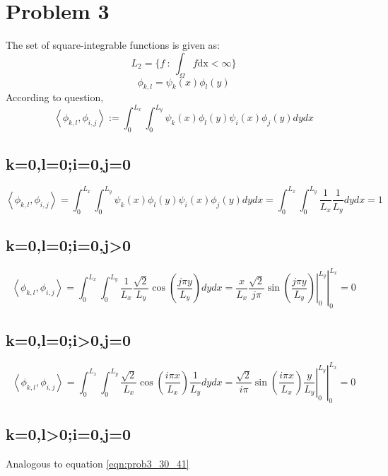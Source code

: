 \documentclass[12pt]{article}
\begin{document}
\section*{Problem 3}
The set of square-integrable functions is given as:
\begin{equation}
L_2 = \{f \ : \ \int_\Omega f \mathrm{dx} < \infty\}
\end{equation}
\begin{equation}
\phi_{k,l}=\psi_k(x)\phi_l(y)
\end{equation}
According to question,
\begin{equation}
\left<\phi_{k,l},\phi_{i,j}\right>:=\int_{0}^{L_x} \int_{0}^{L_y}\psi_k(x)\phi_l(y)\psi_i(x)\phi_j(y)dydx
\end{equation}

\subsection*{k=0,l=0;i=0,j=0}
\begin{equation}
\left<\phi_{k,l},\phi_{i,j}\right>=\int_{0}^{L_x} \int_{0}^{L_y}\psi_k(x)\phi_l(y)\psi_i(x)\phi_j(y)dydx=\int_{0}^{L_x} \int_{0}^{L_y} \frac{1}{L_x} \frac{1}{L_y}dydx=1
\end{equation}
\subsection*{k=0,l=0;i=0,j>0}
\begin{equation}
\left<\phi_{k,l},\phi_{i,j}\right>=\int_{0}^{L_x} \int_{0}^{L_y} \frac{1}{L_x}\frac{\sqrt{2}}{L_y}\cos(\frac{j \pi y}{L_y})dydx=\left.\left.\frac{x}{L_x}\frac{\sqrt{2}}{j \pi}\sin(\frac{j \pi y}{L_y})\right|_{0}^{L_y} \right|_{0}^{L_x}=0
\label{eqn:prob3_30_41}
\end{equation}

\subsection*{k=0,l=0;i>0,j=0}
\begin{equation}
\left<\phi_{k,l},\phi_{i,j}\right>=\int_{0}^{L_x} \int_{0}^{L_y} \frac{\sqrt{2}}{L_x}\cos(\frac{i \pi x}{L_x})\frac{1}{L_y}dydx=\left.\left.\frac{\sqrt{2}}{i \pi}\sin(\frac{i \pi x}{L_x})\frac{y}{L_y} \right|_{0}^{L_y} \right|_{0}^{L_x}=0
\label{eqn:prob3_31_40}
\end{equation}

\subsection*{k=0,l>0;i=0,j=0}
Analogous to equation \eqref{eqn:prob3_30_41}
\end{document}
